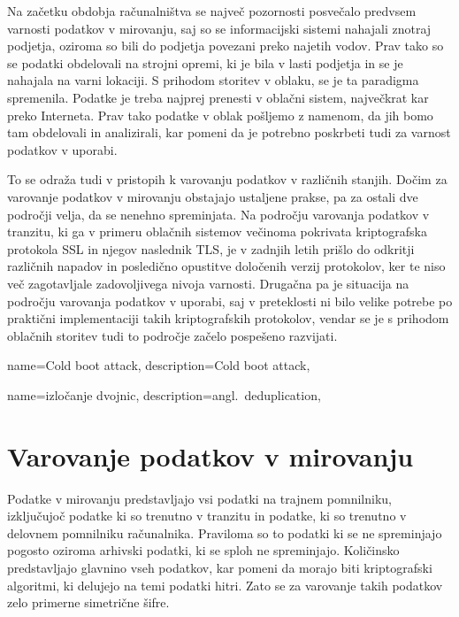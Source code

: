 \documentclass[12pt,a4paper,openany]{book}
\begin{document}
Na začetku obdobja računalništva se največ pozornosti posvečalo predvsem varnosti podatkov v mirovanju, saj so se informacijski sistemi nahajali znotraj podjetja, oziroma so bili do podjetja povezani preko najetih vodov. Prav tako so se podatki obdelovali na strojni opremi, ki je bila v lasti podjetja in se je nahajala na varni lokaciji. S prihodom storitev v oblaku, se je ta paradigma spremenila. Podatke je treba najprej prenesti v oblačni sistem, največkrat kar preko Interneta. Prav tako podatke v oblak pošljemo z namenom, da jih bomo tam obdelovali in analizirali, kar pomeni da je potrebno poskrbeti tudi za varnost podatkov v uporabi.


To se odraža tudi v pristopih k varovanju podatkov v različnih stanjih. Dočim za varovanje podatkov v mirovanju obstajajo ustaljene prakse, pa za ostali dve področji velja, da se nenehno spreminjata. Na področju varovanja podatkov v tranzitu, ki ga v primeru oblačnih sistemov večinoma pokrivata kriptografska protokola \acrfull{SSL} in njegov naslednik \acrfull{TLS}, je v zadnjih letih prišlo do odkritji različnih napadov in posledično opustitve določenih verzij protokolov, ker te niso več zagotavljale zadovoljivega nivoja varnosti. Drugačna pa je situacija na področju varovanja podatkov v uporabi, saj v preteklosti ni bilo velike potrebe po praktični implementaciji takih kriptografskih protokolov, vendar se je s prihodom oblačnih storitev tudi to področje začelo pospešeno razvijati.


{
  name=Cold boot attack,
  description={Cold boot attack},
}

{
  name=izločanje dvojnic,
  description={angl.\ deduplication},
}

\section{Varovanje podatkov v mirovanju}
\label{subs:Varovanje podatkov v mirovanju}

Podatke v mirovanju predstavljajo vsi podatki na trajnem pomnilniku, izključujoč podatke ki so trenutno v tranzitu in podatke, ki so trenutno v delovnem pomnilniku računalnika. Praviloma so to podatki ki se ne spreminjajo pogosto oziroma arhivski podatki, ki se sploh ne spreminjajo. Količinsko predstavljajo glavnino vseh podatkov, kar pomeni da morajo biti kriptografski algoritmi, ki delujejo na temi podatki hitri. Zato se za varovanje takih podatkov zelo primerne simetrične šifre.
\end{document}
